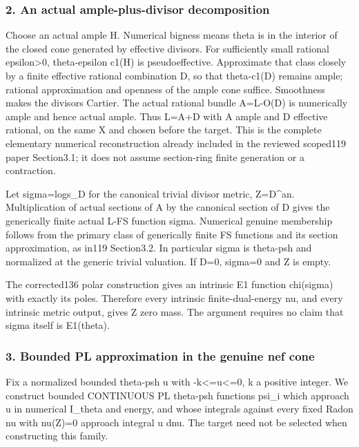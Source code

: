 \documentclass[
]{article}
\begin{document}
\subsubsection{2. An actual ample-plus-divisor
decomposition}\label{an-actual-ample-plus-divisor-decomposition}

Choose an actual ample H. Numerical bigness means theta is in the
interior of the closed cone generated by effective divisors. For
sufficiently small rational epsilon\textgreater0, theta-epsilon c1(H) is
pseudoeffective. Approximate that class closely by a finite effective
rational combination D, so that theta-c1(D) remains ample; rational
approximation and openness of the ample cone suffice. Smoothness makes
the divisors Cartier. The actual rational bundle A=L-O(D) is numerically
ample and hence actual ample. Thus L=A+D with A ample and D effective
rational, on the same X and chosen before the target. This is the
complete elementary numerical reconstruction already included in the
reviewed scoped119 paper Section3.1; it does not assume section-ring
finite generation or a contraction.

Let sigma=log\textbar\textbar s\_D\textbar\textbar{} for the canonical
trivial divisor metric, Z=\textbar D\textbar\^{}an. Multiplication of
actual sections of A by the canonical section of D gives the generically
finite actual L-FS function sigma. Numerical genuine membership follows
from the primary class of generically finite FS functions and its
section approximation, as in119 Section3.2. In particular sigma is
theta-psh and normalized at the generic trivial valuation. If D=0,
sigma=0 and Z is empty.

The corrected136 polar construction gives an intrinsic E1 function
chi(sigma) with exactly its poles. Therefore every intrinsic
finite-dual-energy nu, and every intrinsic metric output, gives Z zero
mass. The argument requires no claim that sigma itself is E1(theta).

\subsubsection{3. Bounded PL approximation in the genuine nef
cone}\label{bounded-pl-approximation-in-the-genuine-nef-cone}

Fix a normalized bounded theta-psh u with -k\textless=u\textless=0, k a
positive integer. We construct bounded CONTINUOUS PL theta-psh functions
psi\_i which approach u in numerical I\_theta and energy, and whose
integrals against every fixed Radon nu with nu(Z)=0 approach integral u
dnu. The target need not be selected when constructing this family.
\end{document}
